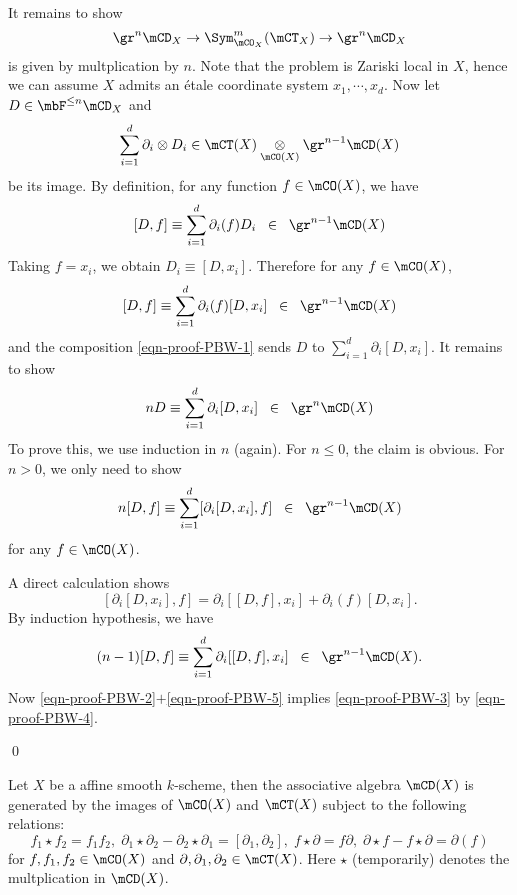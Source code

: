 		It remains to show
		\begin{equation}
			\label{eqn-proof-PBW-1}
			 \gr^n \mCD_X \to \Sym_{\mCO_X}^m (\mCT_X) \to \gr^n \mCD_X 
		\end{equation}
		is given by multplication by $n$. Note that the problem is Zariski local in $X$, hence we can assume $X$ admits an étale coordinate system $x_1,\cdots,x_d$. Now let $D \in \mbF^{\le n}\mCD_X$ and 
		\[
			\sum_{i=1}^d \partial_i \ot D_i \in  \mCT(X) \ot_{\mCO(X)}\gr^{n-1} \mCD(X) 
		\]
		be its image. By definition, for any function $f\in \mCO(X)$, we have
		\[
			[D,f] \equiv \sum_{i=1}^d \partial_i(f) D_i  \;\;\in \;\; \gr^{n-1} \mCD(X)
		\]
		Taking $f=x_i$, we obtain $D_i \equiv [D,x_i]$. Therefore for any $f\in \mCO(X)$,
		\begin{equation}
			\label{eqn-proof-PBW-2}
			[D,f] \equiv \sum_{i=1}^d \partial_i(f)  [D,x_i]  \;\;\in \;\; \gr^{n-1} \mCD(X)
		\end{equation}
		and the composition \eqref{eqn-proof-PBW-1} sends $D$ to $\sum_{i=1}^d \partial_i[D,x_i]$. It remains to show 
		\[
			nD \equiv \sum_{i=1}^d \partial_i[D,x_i] \;\; \in \;\; \gr^{n} \mCD(X)
		\]
		To prove this, we use induction in $n$ (again). For $n\le 0$, the claim is obvious. For $n>0$, we only need to show 
		\begin{equation}
			\label{eqn-proof-PBW-3}
			n[D,f] \equiv \sum_{i=1}^d [\partial_i[D,x_i],f] \;\; \in \;\; \gr^{n-1} \mCD(X)
		\end{equation}
		for any $f\in \mCO(X)$. 

		A direct calculation shows
		\begin{equation}
			\label{eqn-proof-PBW-4}
			[\partial_i[D,x_i],f] = \partial_i[[D,f],x_i] + \partial_i(f)[D,x_i].
		\end{equation}
		By induction hypothesis, we have
		\begin{equation}
			\label{eqn-proof-PBW-5}
			(n-1)[D,f] \equiv \sum_{i=1}^d \partial_i[[D,f],x_i] \;\; \in \;\; \gr^{n-1} \mCD(X).
		\end{equation}
		Now \eqref{eqn-proof-PBW-2}$+$\eqref{eqn-proof-PBW-5} implies \eqref{eqn-proof-PBW-3} by \eqref{eqn-proof-PBW-4}.
		
	\qed

	\begin{cor}
		Let $X$ be a affine smooth $k$-scheme, then the associative algebra $\mCD(X)$ is generated by the images of $\mCO(X)$ and $\mCT(X)$ subject to the following relations:
		\[
			f_1 \star f_2 = f_1 f_2,\; \partial_1 \star\partial_2 - \partial_2 \star\partial_1 = [\partial_1,\partial_2],\; f \star \partial = f\partial,\; \partial\star f - f\star\partial = \partial(f)
		\]
		for $f,f_1,f_2\in \mCO(X)$ and $\partial,\partial_1,\partial_2\in \mCT(X)$. Here $\star$ (temporarily) denotes the multplication in $\mCD(X)$.

	\end{cor}

